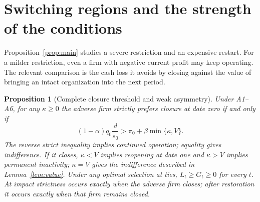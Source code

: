 \documentclass[11pt,letterpaper]{article}
\newtheorem{proposition}{Proposition}
\begin{document}
\section{Switching regions and the strength of the conditions}\label{sec:thresholds}
Proposition~\ref{prop:main} studies a severe restriction and an expensive restart. For a milder restriction, even a firm with negative current profit may keep operating. The relevant comparison is the cash loss it avoids by closing against the value of bringing an intact organization into the next period.
\begin{samepage}
\begin{proposition}[Complete closure threshold and weak asymmetry]\label{prop:regions}
Under A1--A6, for any $\kappa\geq0$ the adverse firm strictly prefers closure at date zero if and only if
\begin{equation}\label{eq:threshold}
(1-\alpha)q_0\frac{d}{s_0}>\pi_0+\beta\min\{\kappa,V\}.
\end{equation}
The reverse strict inequality implies continued operation; equality gives indifference. If it closes, $\kappa<V$ implies reopening at date one and $\kappa>V$ implies permanent inactivity; $\kappa=V$ gives the indifference described in Lemma~\ref{lem:value}. Under any optimal selection at ties, $L_t\geq G_t\geq0$ for every $t$. At impact strictness occurs exactly when the adverse firm closes; after restoration it occurs exactly when that firm remains closed.
\end{proposition}
\end{samepage}
\end{document}
